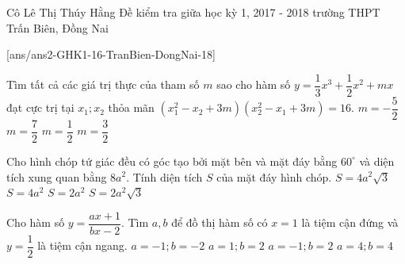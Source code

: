 \begin{name}
{Cô Lê Thị Thúy Hằng}
{Đề kiểm tra giữa học kỳ 1, 2017 - 2018 trường THPT Trấn Biên, Đồng Nai}
\end{name}
\setcounter{ex}{0}
[ans/ans2-GHK1-16-TranBien-DongNai-18]
\begin{ex}%
Tìm tất cả các giá trị thực của tham số $m$ sao cho hàm số $y=\dfrac{1}{3}x^3+\dfrac{1}{2}x^2+mx$ đạt cực trị tại $x_1;x_2$ thỏa mãn $\left(x_1^2-x_2+3m\right) \left(x_2^2-x_1+3m\right)=16.$
\choice
{\True $m=-\dfrac{5}{2}$}
{$m=\dfrac{7}{2}$}
{$m=\dfrac{1}{2}$}
{$m=\dfrac{3}{2}$}
\end{ex}

\begin{ex}%
Cho hình chóp tứ giác đều có góc tạo bởi mặt bên và mặt đáy bằng $60^\circ$ và diện tích xung quan bằng $8a^2$. Tính diện tích $S$ của mặt đáy hình chóp.
\choice
{$S=4a^2\sqrt{3}$}
{\True $S=4a^2$}
{$S=2a^2$}
{$S=2a^2\sqrt{3}$}
\end{ex}


\begin{ex}%
Cho hàm số $y=\dfrac{ax+1}{bx-2}$. Tìm $a,b$ để đồ thị hàm số có $x=1$ là tiệm cận đứng và $y=\dfrac{1}{2}$ là tiệm cận ngang.
\choice
{$a=-1;b=-2$}
{\True$a=1;b=2$}
{$a=-1;b=2$}
{$a=4;b=4$}
\end{ex}

